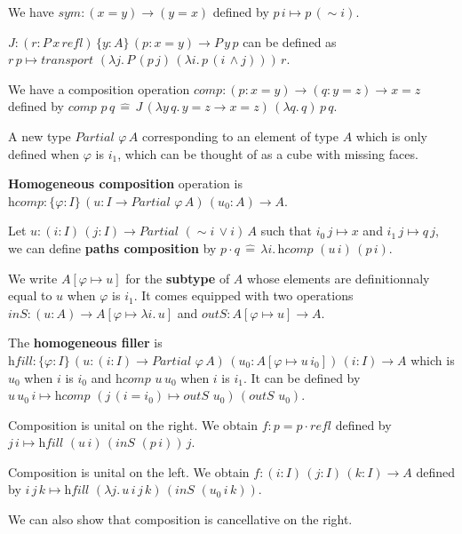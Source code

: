 \documentclass[a4paper]{article}
\begin{document}
We have $sym : (x = y) \to (y = x)$ defined by $p \, i \mapsto p \, (\sim i)$.

$J : (r : P \, x \, \textit{refl}) \, \{ y : A \} \, (p : x = y) \to P \, y \, p$ can be defined as $r \, p \mapsto \textit{transport } (\lambda j. \, P \, (p \, j) \, (\lambda i. \, p \, (i \, \wedge j))) \, r$.

We have a composition operation $\textit{comp} : (p : x = y) \to (q : y = z) \to x = z$ defined by $\textit{comp } p \, q \, \hat{=} \, J \, (\lambda y \, q. \, y = z \to x = z) \, (\lambda q. \, q) \, p \, q$.

A new type $\textit{Partial } \varphi \, A$ corresponding to an element of type $A$ which is only defined when $\varphi$ is $i_1$, which can be thought of as a cube with missing faces.

\textbf{Homogeneous composition} operation is $\textit{hcomp} : \{ \varphi : I \} \, (u : I \to \textit{Partial } \varphi \, A) \, (u_0 : A) \to A$.

Let $u : (i : I) \, (j : I) \to \textit{Partial } (\sim i \, \vee i) \, A$ such that $i_0 \, j \mapsto x$ and $i_1 \, j \mapsto q \, j$, we can define \textbf{paths composition} by $p \cdot q \, \hat{=} \, \lambda i. \, \textit{hcomp } (u \, i) \, (p \, i)$.

We write $A[\varphi \mapsto u]$ for the \textbf{subtype} of $A$ whose elements are definitionnaly equal to $u$ when $\varphi$ is $i_1$. It comes equipped with two operations $\textit{inS} : (u : A) \to A[\varphi \mapsto \lambda i. \, u]$ and $\textit{outS} : A[\varphi \mapsto u] \to A$.

The \textbf{homogeneous filler} is $\textit{hfill} : \{ \varphi : I \} \, (u : (i : I) \to \textit{Partial } \varphi \, A) \, (u_0 : A[\varphi \mapsto u \, i_0]) \, (i : I) \to A$ which is $u_0$ when $i$ is $i_0$ and $\textit{hcomp } u \, u_0$ when $i$ is $i_1$. It can be defined by $u \, u_0 \, i \mapsto \textit{hcomp } (j \, (i = i_0) \mapsto \textit{outS } u_0) \, (\textit{outS } u_0)$.

Composition is unital on the right. We obtain $f : p = p \cdot \textit{refl}$ defined by $j \, i \mapsto \textit{hfill } (u \, i) \, (\textit{inS } (p \, i)) \, j$.

Composition is unital on the left. We obtain $f : (i : I) \, (j : I) \, (k : I) \to A$ defined by $i \, j \, k \mapsto \textit{hfill } (\lambda j. \, u \, i \, j \, k) \, (\textit{inS } (u_0 \, i \, k))$.

We can also show that composition is cancellative on the right.
\end{document}
